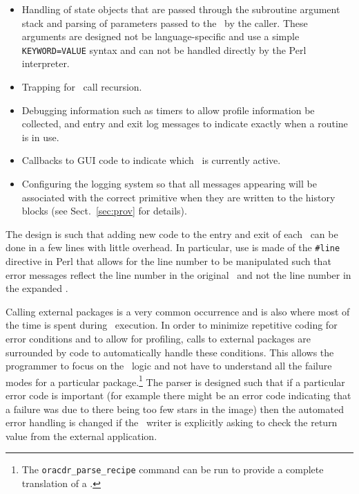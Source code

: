 \documentclass[final,authoryear,5p,times,twocolumn]{elsarticle}
\newcommand*\secref[1]{Sect.~\ref{#1}}
\begin{document}
\begin{itemize}

\item Handling of state objects that are passed through the subroutine
  argument stack and parsing of parameters passed to the \primitive\
  by the caller. These arguments are designed not be language-specific
  and use a simple \texttt{KEYWORD=VALUE} syntax
  and can not be handled directly by the Perl interpreter.

\item Trapping for \primitive\ call recursion.

\item Debugging information
such as timers to allow profile information be
collected, and entry and exit log messages to indicate exactly when
a routine is in use.

\item Callbacks to GUI code to indicate which \primitive\ is
currently active.

\item Configuring the logging system so that all messages appearing
 will be associated with the correct primitive when they are written
to the history blocks (see \secref{sec:prov} for details).

\end{itemize}

The design is such that adding new code to the entry and exit of each
\primitive\ can be done in a few lines with little overhead. In
particular, use is made of the \verb|#line| directive in Perl that
allows for the line number to be manipulated such that error messages
reflect the line number in the original \primitive\ and not the line
number in the expanded \primitive.

Calling external packages is a very common occurrence and is also where
most of the time is spent during \recipe\ execution. In order to
minimize repetitive coding for error conditions and to allow for profiling, calls to
external packages are surrounded by code to automatically handle these
conditions. This allows the programmer to focus on the \recipe\ logic
and not have to understand all the failure modes for a particular
package.\footnote{The \texttt{oracdr\_parse\_recipe} command can be run
to provide a complete translation of a \recipe.}  The parser is
designed such that if a particular error code is important (for
example there might be an error code indicating that a failure was due
to there being too few stars in the image) then the automated error
handling is changed if the \primitive\ writer is explicitly asking to
check the return value from the external application.
\end{document}
